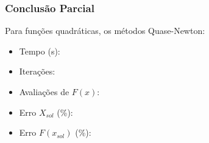 \subsubsection{Conclusão Parcial}
        Para funções quadráticas, os métodos Quase-Newton:
        \begin{itemize}
        \item {Tempo (s):} 
        \item {Iterações:} 
        \item {Avaliações de $F(x)$:} 
        \item {Erro $X_{sol}$ (\%):} 
        \item {Erro $F(x_{sol})$ (\%):} 
        \end{itemize}